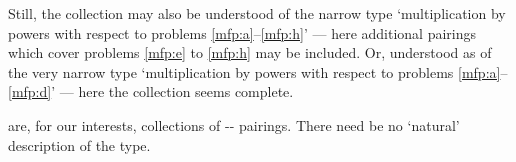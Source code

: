 \begin{note}
  Still, the collection may also be understood  of the narrow type `multiplication by powers with respect to problems \ref{mfp:a}--\ref{mfp:h}' --- here additional pairings which cover problems \ref{mfp:e} to \ref{mfp:h} may be included.
  Or, understood as  of the very narrow type `multiplication by powers with respect to problems \ref{mfp:a}--\ref{mfp:d}' --- here the collection seems complete.

   are, for our interests, collections of -- pairings.
  There need be no `natural' description of the type.
\end{note}

\subsection{}
\label{sec:ptr0}

